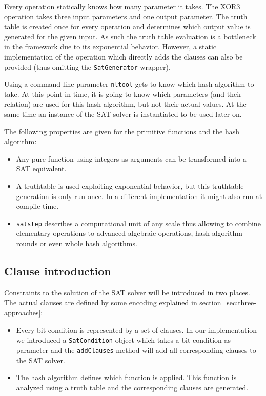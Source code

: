 Every operation statically knows how many parameter it takes. The XOR3 operation takes three input parameters and one output parameter. The truth table is created once for every operation and determines which output value is generated for the given input. As such the truth table evaluation is a bottleneck in the framework due to its exponential behavior. However, a static implementation of the operation which directly adds the clauses can also be provided (thus omitting the \texttt{SatGenerator} wrapper).

Using a command line parameter \texttt{nltool} gets to know which hash algorithm to take. At this point in time, it is going to know which parameters (and their relation) are used for this hash algorithm, but not their actual values. At the same time an instance of the SAT solver is instantiated to be used later on.

The following properties are given for the primitive functions and the hash algorithm:
\begin{itemize}
  \item Any pure function using integers as arguments can be transformed into a SAT equivalent.
  \item A truthtable is used exploiting exponential behavior, but this truthtable generation is only run once. In a different implementation it might also run at compile time.
  \item \texttt{satstep} describes a computational unit of any scale thus allowing to combine elementary operations to advanced algebraic operations, hash algorithm rounds or even whole hash algorithms.
\end{itemize}

\subsection{Clause introduction}
\label{sec:clause-introduction}
%
Constraints to the solution of the SAT solver will be introduced in two places. The actual clauses are defined by some encoding explained in section~\ref{sec:three-approaches}:
\begin{itemize}
  \item Every bit condition is represented by a set of clauses. In our implementation we introduced a \texttt{SatCondition} object which takes a bit condition as parameter and the \texttt{addClauses} method will add all corresponding clauses to the SAT solver.
  \item The hash algorithm defines which function is applied. This function is analyzed using a truth table and the corresponding clauses are generated.
\end{itemize}


